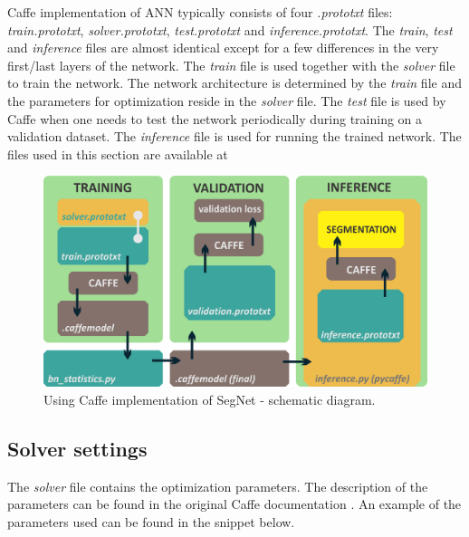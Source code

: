 Caffe implementation of ANN typically consists of four \textit{.prototxt} files: \textit{train.prototxt}, \textit{solver.prototxt}, \textit{test.prototxt} and \textit{inference.prototxt}. The \textit{train}, \textit{test} and \textit{inference} files are almost identical except for a few differences in the very first/last layers of the network. The \textit{train} file is used together with the \textit{solver} file to train the network. The network architecture is determined by the \textit{train} file and the parameters for optimization reside in the \textit{solver} file. The \textit{test} file is used by Caffe when one needs to test the network periodically during training on a validation dataset. \cite{caffe} The \textit{inference} file is used for running the trained network. The files used in this section are available at \cite{filip_github}

\vspace{4mm}
\begin{figure}[h]
	\begin{center}
		\includegraphics*[width=14cm, keepaspectratio]{obr/caffe.png}
	\end{center}
	\vspace{4mm}
	\caption{Using Caffe implementation of SegNet - schematic diagram.} 
	\label{kafe}
\end{figure}

\subsection{Solver settings}

The \textit{solver} file contains the optimization parameters. The description of the parameters can be found in the original Caffe documentation \cite{caffe}. An example of the parameters used can be found in the snippet below. 

